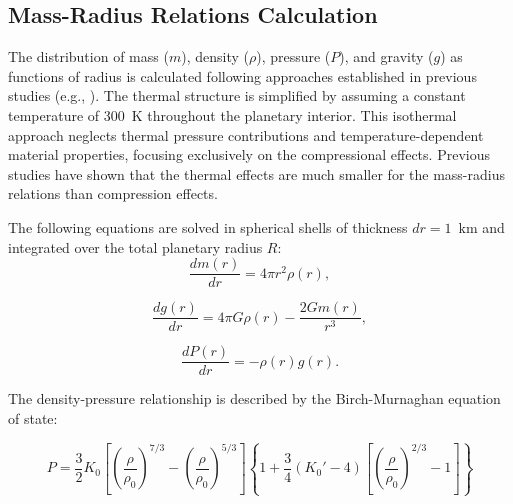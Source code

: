 \documentclass[draft,jgrga,12pt]{agujournal2019}
\begin{document}
\subsection{Mass-Radius Relations Calculation}

 
The distribution of mass ($m$), density ($\rho$), pressure ($P$), and gravity ($g$) as functions of radius is calculated following approaches established in previous studies (e.g., ).
The thermal structure is simplified by assuming a constant temperature of 300~K throughout the planetary interior. 
This isothermal approach neglects thermal pressure contributions and temperature-dependent material properties, focusing exclusively on the compressional effects.
Previous studies \cite{zeng_new_2021, zeng_detailed_2013} have shown that the thermal effects are much smaller for the mass-radius relations than compression effects.

The following equations are solved in spherical shells of thickness $dr = 1$~$\mathrm{km}$ and integrated over the total planetary radius $R$:
\begin{equation}
    \frac{dm(r)}{dr} = 4\pi r^2\rho (r),
\end{equation}

\begin{equation}
    \frac{dg(r)}{dr} = 4 \pi G\rho (r) -\frac{2Gm(r)}{r^3},
\end{equation}

\begin{equation}
    \frac{dP(r)}{dr} = -\rho (r) g (r).
\end{equation}
    
The density-pressure relationship is described by the Birch-Murnaghan equation of state:

\begin{equation}
P = \frac{3}{2}K_0\left[\left(\frac{\rho}{\rho_0}\right)^{7/3} - \left(\frac{\rho}{\rho_0}\right)^{5/3}\right]\left\{1 + \frac{3}{4}(K_0' - 4)\left[\left(\frac{\rho}{\rho_0}\right)^{2/3} - 1\right]\right\}
\end{equation}
\end{document}
